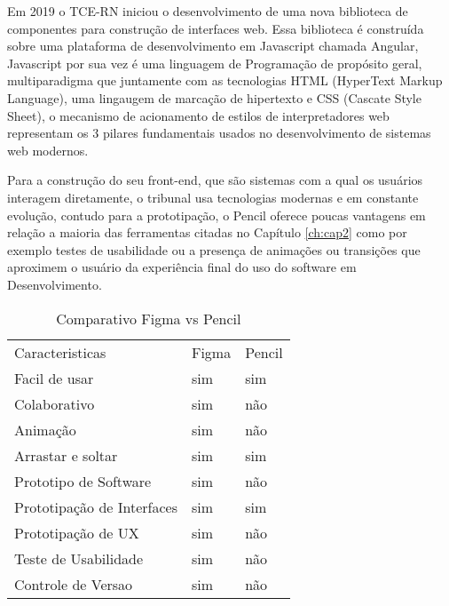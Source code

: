 Em 2019 o TCE-RN iniciou o desenvolvimento de uma nova biblioteca de componentes para construção de interfaces web. Essa biblioteca é construída sobre uma plataforma de desenvolvimento em Javascript chamada Angular, Javascript por sua vez é uma linguagem de Programação de propósito geral, multiparadigma que juntamente com as tecnologias HTML (HyperText Markup Language), uma lingaugem de marcação de hipertexto e CSS (Cascate Style Sheet), o mecanismo de acionamento de estilos de interpretadores web representam os 3 pilares fundamentais usados no desenvolvimento de sistemas web modernos.

Para a construção do seu front-end, que são sistemas com a qual os usuários interagem diretamente, o tribunal usa tecnologias modernas e em constante evolução, contudo para a prototipação, o Pencil oferece poucas vantagens em relação a maioria das ferramentas citadas no Capítulo \ref{ch:cap2} como por exemplo testes de usabilidade ou a presença de animações ou transições que aproximem o usuário da experiência final do uso do software em Desenvolvimento.

\begin{table*}[!ht]
	\centering
	\caption{Comparativo Figma vs Pencil}
	\begin{tabular}{lll}

		\rowcolor[HTML]{AAAAAA}
		Caracteristicas            &
		Figma                      &
		Pencil                       \\
		\rowcolor[HTML]{DDDDDD}
		Facil de usar              &
		sim                        &
		sim                          \\
		Colaborativo               &
		sim                        &
		não                          \\
		\rowcolor[HTML]{DDDDDD}
		Animação                   &
		sim                        &
		não                          \\
		Arrastar e soltar          &
		sim                        &
		sim                          \\
		\rowcolor[HTML]{DDDDDD}
		Prototipo de Software      &
		sim                        &
		não                          \\
		Prototipação de Interfaces &
		sim                        &
		sim                          \\
		\rowcolor[HTML]{DDDDDD}
		Prototipação de UX         &
		sim                        &
		não                          \\
		Teste de Usabilidade       &
		sim                        &
		não                          \\
		\rowcolor[HTML]{DDDDDD}
		Controle de Versao         &
		sim                        &
		não                          \\
	\end{tabular}
	\label{table-figma_vs_pencil}
\end{table*}

